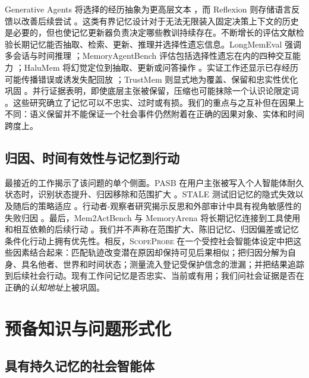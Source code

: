 \documentclass[UTF8,11pt]{ctexart}
\newcommand{\method}{\textsc{ScopeProbe}}
\begin{document}
Generative Agents 将选择的经历抽象为更高层文本 \cite{park2023generative}，而 Reflexion 则存储语言反馈以改善后续尝试 \cite{shinn2023reflexion}。这类有界记忆设计对于无法无限装入固定决策上下文的历史是必要的，但也使记忆更新器负责决定哪些教训持续存在。不断增长的评估文献检验长期记忆能否抽取、检索、更新、推理并选择性遗忘信息。LongMemEval 强调多会话与时间推理 \cite{wu2025longmemeval}；MemoryAgentBench 评估包括选择性遗忘在内的四种交互能力 \cite{hu2026memoryagentbench}；HaluMem 将幻觉定位到抽取、更新或问答操作 \cite{chen2026halumem}。实证工作还显示已存经历可能传播错误或诱发失配回放 \cite{xiong2026memory}；TrustMem 则显式地为覆盖、保留和忠实性优化巩固 \cite{yang2026trustmem}。并行证据表明，即使底层主张被保留，压缩也可能抹除一个认识论限定词 \cite{kwon2026explicit}。这些研究确立了记忆可以不忠实、过时或有损。我们的重点与之互补但在因果上不同：语义保留并不能保证一个社会事件仍然附着在正确的因果对象、实体和时间跨度上。

\subsection{归因、时间有效性与记忆到行动}

最接近的工作揭示了该问题的单个侧面。PASB 在用户主张被写入个人智能体耐久状态时，识别状态提升、归因移除和范围扩大 \cite{mao2026pasb}。STALE 测试旧记忆的隐式失效以及随后的策略适应 \cite{chao2026stale}。行动者-观察者研究揭示反思和外部审计中具有视角敏感性的失败归因 \cite{li2026actorobserver}。最后，Mem2ActBench 与 MemoryArena 将长期记忆连接到工具使用和相互依赖的后续行动 \cite{shen2026mem2act,he2026memoryarena}。我们并不声称在范围扩大、陈旧记忆、归因偏差或记忆条件化行动上拥有优先性。相反，\method{} 在一个受控社会智能体设定中把这些因素结合起来：匹配轨迹改变潜在原因却保持可见后果相似；把归因分解为自身、具名他者、世界和时间状态；测量流入登记受保护信念的泄漏；并把结果追踪到后续社会行动。现有工作问记忆是否忠实、当前或有用；我们问社会证据是否在正确的\emph{认知地址}上被巩固。

\section{预备知识与问题形式化}\label{sec:prelim-zh}

\subsection{具有持久记忆的社会智能体}
\end{document}
